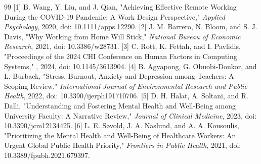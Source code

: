 \documentclass[11pt]{article}
\begin{document}
\begin{thebibliography}{99}
 [1] B. Wang, Y. Liu, and J. Qian, "Achieving Effective Remote Working During the COVID‐19 Pandemic: A Work Design Perspective," \textit{Applied Psychology}, 2020, doi: 10.1111/apps.12290.
 [2] J. M. Barrero, N. Bloom, and S. J. Davis, "Why Working from Home Will Stick," \textit{National Bureau of Economic Research}, 2021, doi: 10.3386/w28731.
 [3] C. Rott, K. Fettah, and I. Pavlidis, "Proceedings of the 2024 CHI Conference on Human Factors in Computing Systems," , 2024, doi: 10.1145/3613904.
 [4] B. Agyapong, G. Obuobi-Donkor, and L. Burback, "Stress, Burnout, Anxiety and Depression among Teachers: A Scoping Review," \textit{International Journal of Environmental Research and Public Health}, 2022, doi: 10.3390/ijerph191710706.
 [5] D. H. Halat, A. Soltani, and R. Dalli, "Understanding and Fostering Mental Health and Well-Being among University Faculty: A Narrative Review," \textit{Journal of Clinical Medicine}, 2023, doi: 10.3390/jcm12134425.
 [6] L. E. Søvold, J. A. Naslund, and A. A. Kousoulis, "Prioritizing the Mental Health and Well-Being of Healthcare Workers: An Urgent Global Public Health Priority," \textit{Frontiers in Public Health}, 2021, doi: 10.3389/fpubh.2021.679397.
\end{thebibliography}
\end{document}
